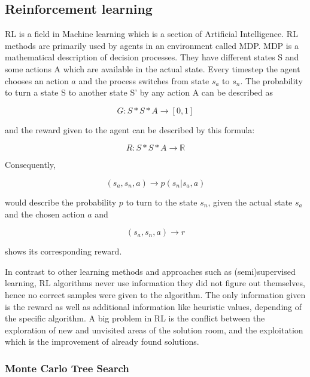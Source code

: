 \subsection{Reinforcement learning} 
 
\ac{RL} is a field in Machine learning which is a section of Artificial Intelligence. \ac{RL} methods are primarily used by agents in an environment called \ac{MDP}. \ac{MDP} is a mathematical description of decision processes. They have different states S and some actions A which are available in the actual state. Every timestep the agent chooses an action $a$ and the process switches from state $s_a$ to $s_n$. The probability to turn a state S to another state S' by any action A can be described as

\begin{equation}
	G: S*S*A \rightarrow [0,1] 
\end{equation}

and the reward given to the agent can be described by this formula:

\begin{equation}
	R: S*S*A \rightarrow \mathbb{R}
\end{equation}

Consequently,

\begin{equation}
	(s_a, s_n, a) \rightarrow p(s_n|s_a, a)
\end{equation}

would describe the probability $p$ to turn to the state $s_n$, given the actual state $s_a$ and the chosen action $a$ and 

\begin{equation}
	(s_a, s_n, a) \rightarrow r
\end{equation}

shows its corresponding reward.  


In contrast to other learning methods and approaches such as (semi)supervised learning, RL algorithms never use information they did not figure out themselves, hence no correct samples were given to the algorithm. The only information given is the reward as well as additional information like heuristic values, depending of the specific algorithm. 
A big problem in \ac{RL} is the conflict between the exploration of new and unvisited areas of the solution room, and the exploitation which is the improvement of already found solutions.

\subsubsection{Monte Carlo Tree Search} 

